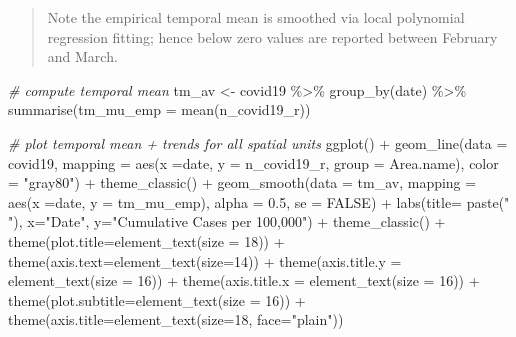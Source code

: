 \documentclass[
]{book}
\newenvironment{Shaded}{\begin{snugshade}}{\end{snugshade}}
\newcommand{\AttributeTok}[1]{\textcolor[rgb]{0.77,0.63,0.00}{#1}}
\newcommand{\CommentTok}[1]{\textcolor[rgb]{0.56,0.35,0.01}{\textit{#1}}}
\newcommand{\ConstantTok}[1]{\textcolor[rgb]{0.00,0.00,0.00}{#1}}
\newcommand{\DecValTok}[1]{\textcolor[rgb]{0.00,0.00,0.81}{#1}}
\newcommand{\FloatTok}[1]{\textcolor[rgb]{0.00,0.00,0.81}{#1}}
\newcommand{\FunctionTok}[1]{\textcolor[rgb]{0.00,0.00,0.00}{#1}}
\newcommand{\NormalTok}[1]{#1}
\newcommand{\OtherTok}[1]{\textcolor[rgb]{0.56,0.35,0.01}{#1}}
\newcommand{\SpecialCharTok}[1]{\textcolor[rgb]{0.00,0.00,0.00}{#1}}
\newcommand{\StringTok}[1]{\textcolor[rgb]{0.31,0.60,0.02}{#1}}
\begin{document}
\begin{quote}
Note the empirical temporal mean is smoothed via local polynomial regression fitting; hence below zero values are reported between February and March.
\end{quote}

\begin{Shaded}
\begin{Highlighting}[]
\CommentTok{\# compute temporal mean}
\NormalTok{tm\_av }\OtherTok{\textless{}{-}}\NormalTok{ covid19 }\SpecialCharTok{\%\textgreater{}\%} \FunctionTok{group\_by}\NormalTok{(date) }\SpecialCharTok{\%\textgreater{}\%}
  \FunctionTok{summarise}\NormalTok{(}\AttributeTok{tm\_mu\_emp =} \FunctionTok{mean}\NormalTok{(n\_covid19\_r))}

\CommentTok{\# plot temporal mean + trends for all spatial units}
\FunctionTok{ggplot}\NormalTok{() }\SpecialCharTok{+}
  \FunctionTok{geom\_line}\NormalTok{(}\AttributeTok{data =}\NormalTok{ covid19, }\AttributeTok{mapping =} \FunctionTok{aes}\NormalTok{(}\AttributeTok{x =}\NormalTok{date, }\AttributeTok{y =}\NormalTok{ n\_covid19\_r,}
                          \AttributeTok{group =}\NormalTok{ Area.name), }\AttributeTok{color =} \StringTok{"gray80"}\NormalTok{) }\SpecialCharTok{+}
   \FunctionTok{theme\_classic}\NormalTok{() }\SpecialCharTok{+}
  \FunctionTok{geom\_smooth}\NormalTok{(}\AttributeTok{data =}\NormalTok{ tm\_av, }\AttributeTok{mapping =} \FunctionTok{aes}\NormalTok{(}\AttributeTok{x =}\NormalTok{date, }\AttributeTok{y =}\NormalTok{ tm\_mu\_emp), }
              \AttributeTok{alpha =} \FloatTok{0.5}\NormalTok{,}
              \AttributeTok{se =} \ConstantTok{FALSE}\NormalTok{) }\SpecialCharTok{+}
    \FunctionTok{labs}\NormalTok{(}\AttributeTok{title=} \FunctionTok{paste}\NormalTok{(}\StringTok{" "}\NormalTok{), }\AttributeTok{x=}\StringTok{"Date"}\NormalTok{, }\AttributeTok{y=}\StringTok{"Cumulative Cases per 100,000"}\NormalTok{) }\SpecialCharTok{+}
    \FunctionTok{theme\_classic}\NormalTok{() }\SpecialCharTok{+}
    \FunctionTok{theme}\NormalTok{(}\AttributeTok{plot.title=}\FunctionTok{element\_text}\NormalTok{(}\AttributeTok{size =} \DecValTok{18}\NormalTok{)) }\SpecialCharTok{+}
    \FunctionTok{theme}\NormalTok{(}\AttributeTok{axis.text=}\FunctionTok{element\_text}\NormalTok{(}\AttributeTok{size=}\DecValTok{14}\NormalTok{)) }\SpecialCharTok{+}
    \FunctionTok{theme}\NormalTok{(}\AttributeTok{axis.title.y =} \FunctionTok{element\_text}\NormalTok{(}\AttributeTok{size =} \DecValTok{16}\NormalTok{)) }\SpecialCharTok{+}
    \FunctionTok{theme}\NormalTok{(}\AttributeTok{axis.title.x =} \FunctionTok{element\_text}\NormalTok{(}\AttributeTok{size =} \DecValTok{16}\NormalTok{)) }\SpecialCharTok{+}
    \FunctionTok{theme}\NormalTok{(}\AttributeTok{plot.subtitle=}\FunctionTok{element\_text}\NormalTok{(}\AttributeTok{size =} \DecValTok{16}\NormalTok{)) }\SpecialCharTok{+}
    \FunctionTok{theme}\NormalTok{(}\AttributeTok{axis.title=}\FunctionTok{element\_text}\NormalTok{(}\AttributeTok{size=}\DecValTok{18}\NormalTok{, }\AttributeTok{face=}\StringTok{"plain"}\NormalTok{))}
\end{Highlighting}
\end{Shaded}
\end{document}
